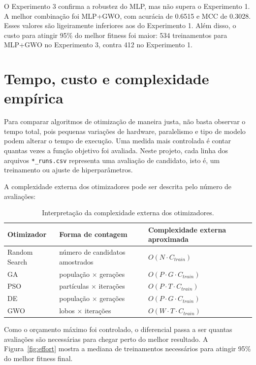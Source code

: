 \documentclass[12pt,a4paper]{article}
\begin{document}
O Experimento 3 confirma a robustez do MLP, mas não supera o Experimento 1. A melhor combinação foi MLP+GWO, com acurácia de 0.6515 e MCC de 0.3028. Esses valores são ligeiramente inferiores aos do Experimento 1. Além disso, o custo para atingir 95\% do melhor fitness foi maior: 534 treinamentos para MLP+GWO no Experimento 3, contra 412 no Experimento 1.

\section{Tempo, custo e complexidade empírica}

Para comparar algoritmos de otimização de maneira justa, não basta observar o tempo total, pois pequenas variações de hardware, paralelismo e tipo de modelo podem alterar o tempo de execução. Uma medida mais controlada é contar quantas vezes a função objetivo foi avaliada. Neste projeto, cada linha dos arquivos \texttt{*\_runs.csv} representa uma avaliação de candidato, isto é, um treinamento ou ajuste de hiperparâmetros.

A complexidade externa dos otimizadores pode ser descrita pelo número de avaliações:

\begin{table}[H]
\centering
\caption{Interpretação da complexidade externa dos otimizadores.}
\label{tab:complexity}
\small
\begin{tabular}{p{2.8cm}p{5.0cm}p{5.2cm}}
\toprule
Otimizador & Forma de contagem & Complexidade externa aproximada \\
\midrule
Random Search & número de candidatos amostrados & $O(N \cdot C_{train})$ \\
GA & população $\times$ gerações & $O(P \cdot G \cdot C_{train})$ \\
PSO & partículas $\times$ iterações & $O(P \cdot T \cdot C_{train})$ \\
DE & população $\times$ gerações & $O(P \cdot G \cdot C_{train})$ \\
GWO & lobos $\times$ iterações & $O(W \cdot T \cdot C_{train})$ \\
\bottomrule
\end{tabular}
\end{table}

Como o orçamento máximo foi controlado, o diferencial passa a ser quantas avaliações são necessárias para chegar perto do melhor resultado. A Figura~\ref{fig:effort} mostra a mediana de treinamentos necessários para atingir 95\% do melhor fitness final.
\end{document}
